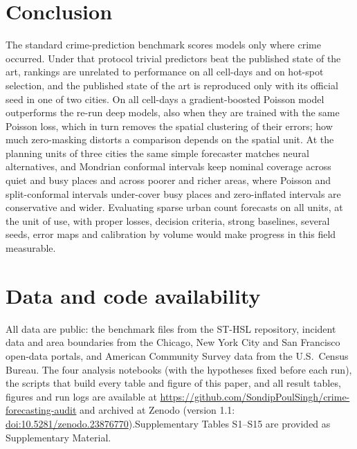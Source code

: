 \documentclass[preprint,12pt,authoryear]{elsarticle}
\newif\ifanonymous
\newcommand{\repo}{\url{https://github.com/SondipPoulSingh/crime-forecasting-audit}}
\newcommand{\anonrepo}{\url{https://anonymous.4open.science/r/crime-forecasting-audit-7131/}}
\begin{document}
\section{Conclusion}\label{sec:conclusion}
The standard crime-prediction benchmark scores models only where crime occurred. Under that protocol trivial predictors beat the published state of the art, rankings are unrelated to performance on all cell-days and on hot-spot selection, and the published state of the art is reproduced only with its official seed in one of two cities. On all cell-days a gradient-boosted Poisson model outperforms the re-run deep models, also when they are trained with the same Poisson loss, which in turn removes the spatial clustering of their errors; how much zero-masking distorts a comparison depends on the spatial unit. At the planning units of three cities the same simple forecaster matches neural alternatives, and Mondrian conformal intervals keep nominal coverage across quiet and busy places and across poorer and richer areas, where Poisson and split-conformal intervals under-cover busy places and zero-inflated intervals are conservative and wider. Evaluating sparse urban count forecasts on all units, at the unit of use, with proper losses, decision criteria, strong baselines, several seeds, error maps and calibration by volume would make progress in this field measurable.

\section*{Data and code availability}
All data are public: the benchmark files from the ST-HSL repository, incident data and area boundaries from the Chicago, New York City and San Francisco open-data portals, and American Community Survey data from the U.S.\ Census Bureau. The four analysis notebooks (with the hypotheses fixed before each run), the scripts that build every table and figure of this paper, and all result tables, figures and run logs are \ifanonymous publicly available. For double-anonymized review, an anonymised copy of the repository is available at \anonrepo{}; the public repository and its archived DOI are given on the title page.\else available at \repo{} and archived at Zenodo (version 1.1: \href{https://doi.org/10.5281/zenodo.23876770}{doi:10.5281/zenodo.23876770}).\fi Supplementary Tables S1--S15 are provided as Supplementary Material.

\ifanonymous\else
\end{document}
